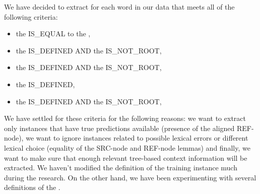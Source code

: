 We have decided to extract  for each word in our data that meets all of the following criteria:
\begin{itemize}
    \item the  IS\_EQUAL to the ,
    \item the  IS\_DEFINED AND\newline{}
        the  IS\_NOT\_ROOT,
    \item the  IS\_DEFINED AND\newline{}
        the  IS\_NOT\_ROOT,
    \item the  IS\_DEFINED,
    \item the  IS\_DEFINED AND\newline{}
        the  IS\_NOT\_ROOT,
\end{itemize}
We have settled for these criteria for the following reasons: we want to extract only instances that have true predictions
available (presence of the aligned REF-node), we want to ignore  instances related
to possible lexical errors or different lexical choice (equality of the SRC-node and REF-node lemmas)
and finally, we want to make sure that
enough relevant tree-based context information will be extracted. We haven't modified the definition
of the training instance much during the research. On the other hand, we have been experimenting with several definitions
of the .

